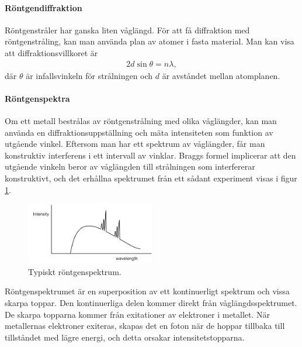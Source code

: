 \paragraph{Röntgendiffraktion}
Röntgenstråler har ganska liten våglängd. För att få diffraktion med röntgenstråling, kan man använda plan av atomer i fasta material. Man kan visa att diffraktionsvillkoret är
\begin{align*}
	2d\sin{\theta} = n\lambda,
\end{align*}
där $\theta$ är infallsvinkeln för strålningen och $d$ är avståndet mellan atomplanen.

\paragraph{Röntgenspektra}
Om ett metall bestrålas av röntgenstrålning med olika våglängder, kan man använda en diffraktionsuppställning och mäta intensiteten som funktion av utgående vinkel. Eftersom man har ett spektrum av våglängder, får man konstruktiv interferens i ett intervall av vinklar. Braggs formel implicerar att den utgående vinkeln beror av våglängden till strålningen som interfererar konstruktivt, och det erhållna spektrumet från ett sådant experiment visas i figur \ref{fig:x-ray_spectrum}.

\begin{figure}[!ht]
	\centering
	\includegraphics[width = 0.5\textwidth]{./Images/x-ray_spectrum.jpg}
	\caption{Typiskt röntgenspektrum.}
	\label{fig:x-ray_spectrum}
\end{figure}

Röntgenspektrumet är en superposition av ett kontinuerligt spektrum och vissa skarpa toppar. Den kontinuerliga delen kommer direkt från våglängdsspektrumet. De skarpa topparna 
kommer från exitationer av elektroner i metallet. När metallernas elektroner exiteras, skapas det en foton när de hoppar tillbaka till tillståndet med lägre energi, och detta orsakar intensitetstopparna.

